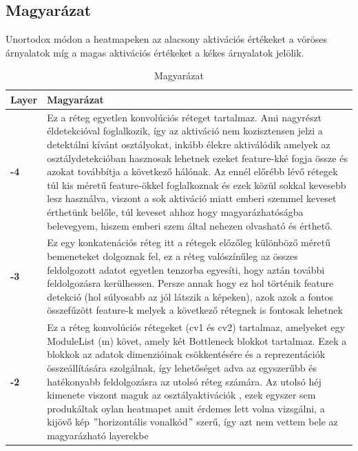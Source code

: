 \documentclass[12pt,oneside,a4paper]{article}
\theoremstyle{remark}
\begin{document}
\subsection{Magyarázat}\label{subsec:magyarazat}
Unortodox módon a heatmapeken az alacsony aktivációs értékeket a vöröses árnyalatok míg a magas aktivációs értékeket a
kékes árnyalatok jelölik.

\begin{table}[ht]
    \center
    \begin{tabularx}{\textwidth}{|p{}||X|}
        \hline
        \textbf{Layer} & Magyarázat     \\
        \hline
        \textbf{-4}    & Ez a réteg egyetlen konvolúciós réteget tartalmaz.
        Ami nagyrészt éldetekcióval foglalkozik, így az aktiváció nem kozisztensen jelzi a detektálni kívánt osztályokat,
        inkább élekre aktiválódik amelyek az osztálydetekcióban hasznosak lehetnek ezeket \gls{feature}-kké fogja
        össze és azokat továbbítja a következő hálónak.
        Az ennél előrébb lévő rétegek túl kis méretű feature-ökkel foglalkoznak és ezek közül sokkal kevesebb lesz használva,
        viszont a sok aktiváció miatt emberi szemmel keveset érthetünk belőle, túl keveset ahhoz hogy magyarázhatóságba belevegyem,
        hiszem emberi szem által nehezen olvasható és érthető.\\
        \hline
        \textbf{-3}    & Ez egy konkatenációs réteg itt a rétegek előzőleg különböző méretű bemeneteket dolgoznak fel, ez a
        réteg valószínűleg az összes feldolgozott adatot egyetlen tenzorba egyesíti, hogy aztán további feldolgozásra kerülhessen.
        Persze annak hogy ez hol történik \gls{feature} detekció (hol súlyosabb az jól látszik a képeken), azok azok a fontos összefűzött \gls{feature}-k
        melyek a következő rétegnek is fontosak lehetnek\\
        \hline
        \textbf{-2}    &  Ez a réteg konvolúciós rétegeket (cv1 és cv2) tartalmaz, amelyeket egy ModuleList (m) követ,
        amely két Bottleneck blokkot tartalmaz.
        Ezek a blokkok az adatok dimenzióinak csökkentésére és a reprezentációk összeállítására szolgálnak,
        így lehetőséget adva az egyszerűbb és hatékonyabb feldolgozásra az utolsó réteg számára.
        Az utolsó héj kimenete viszont maguk az osztályaktivációk , ezek egyszer sem produkáltak oylan heatmapet amit
        érdemes lett volna vizsgálni, a kijövő kép \("\)horizontális vonalkód\("\) szerű, így azt nem vettem bele az
        magyarázható layerekbe\\
        \hline
    \end{tabularx}
    \caption{Magyarázat}\label{tab:debrief}
\end{table}
\end{document}
